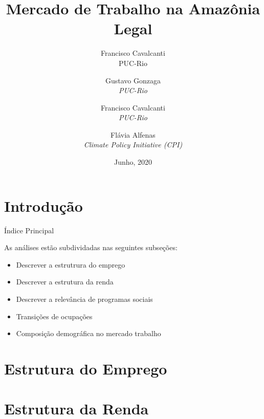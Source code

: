 \documentclass[11pt]{beamer}
\author[Francisco Cavalcanti]{Francisco Cavalcanti\\\footnotesize{PUC-Rio}
}
\author{
Gustavo Gonzaga \\
\textit{PUC-Rio}\\ \vspace{3mm}
\and  
Francisco Cavalcanti\\
\textit{PUC-Rio}\\ \vspace{3mm}
\and   
Flávia  Alfenas\\
\textit{Climate Policy Initiative (CPI)} 
}
\date{Junho, 2020}
\title{Mercado de Trabalho na Amazônia Legal}
\begin{document}
\begin{frame}
\titlepage
\end{frame}

\begin{frame}
\tableofcontents
\end{frame}

\section{Introdução}

\begin{frame}[label=indice_principal]{Índice Principal}

As análises estão subdividadas nas seguintes subseções:  \hspace{3mm}

\begin{itemize}
\item{Descrever a estrutrura do emprego \hyperlink{_estrutura_emprego}{} } \hspace{3mm}
\item{Descrever a estrutura da renda \hyperlink{_estrutura_renda}{} } \hspace{3mm}
\item{Descrever a relevância de programas sociais \hyperlink{_programas_sociais}{} } \hspace{3mm}
\item{Transições de ocupações \hyperlink{_transicao_ocupacao}{} } \hspace{3mm}
\item{Composição demográfica no mercado trabalho \hyperlink{_composicao_demografica}{} } \hspace{3mm}

\end{itemize}

\end{frame}

\section{Estrutura do Emprego}



\section{Estrutura da Renda}
\end{document}
